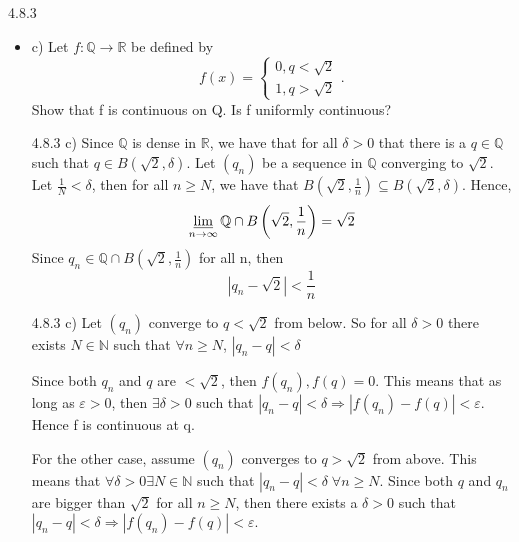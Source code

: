 \documentclass[a4paper,norsk]{article}
\renewcommand{\geq}{\geqslant}
\renewcommand{\epsilon}{\varepsilon}
\begin{document}
\begin{oppgavebox}{4.8.3}{}
\begin{itemize}
\begin{proofbox}{4.8.3 b)}{}
    Hence, $ \overline{f} $ is uniformly continuous.
    
    
    

    
  \end{proofbox}
  \item c) Let $ f : \mathbb{Q} \to \mathbb{R} $ be defined by 
  \[
      f(x) = \begin{cases}
      0, q < \sqrt{ 2 }\\
      1, q > \sqrt{ 2 }
      \end{cases}.
  \]
  Show that f is continuous on Q. Is f uniformly continuous?
  \begin{proofbox}{4.8.3 c)}{}
    Since $ \mathbb{Q} $ is dense in $ \mathbb{R} $, we have that for all $ \delta > 0 $ that there is a $ q \in \mathbb{Q} $ such that $ q \in B \left( \sqrt{ 2 }, \delta  \right)  $. Let $ \left( q_n \right)  $ be a sequence in $ \mathbb{Q} $ converging to $ \sqrt{ 2 } $. Let $ \frac{ 1 }{ N } < \delta  $, then for all $ n \geq N $, we have that $ B \left( \sqrt{ 2 }, \frac{ 1 }{ n } \right) \subseteq B \left( \sqrt{ 2 }, \delta  \right)   $. Hence,
    \[
        \varliminf_{n \to \infty} \mathbb{Q} \cap B \left( \sqrt{ 2 }, \frac{ 1 }{ n } \right) = \sqrt{ 2 }
    \]
    Since $ q_n \in \mathbb{Q} \cap B \left( \sqrt{ 2 }, \frac{ 1 }{ n } \right)  $ for all n, then 
    \[
        \left| q_n - \sqrt{ 2 } \right| < \frac{ 1 }{ n }
    \]
    
    
  \end{proofbox}


  \begin{proofbox}{4.8.3 c)}{}
    Let $ \left( q_n \right)  $ converge to $ q < \sqrt{ 2 } $ from below. So for all $ \delta > 0 $ there exists $ N \in \mathbb{N} $ such that $ \forall n \geq N $, $ \left| q_n - q \right| < \delta   $

    Since both $ q_n  $ and $ q $ are $ < \sqrt{ 2 } $, then $ f(q_n), f(q) = 0 $. This means that as long as $ \epsilon > 0 $, then $ \exists \delta > 0 $ such that $ \left| q_n - q \right| < \delta  \Rightarrow \left| f(q_n) - f(q) \right| < \epsilon  $. Hence f is continuous at q.



    For the other case, assume $ \left( q_n \right)  $ converges to $ q > \sqrt{ 2 } $ from above. This means that $ \forall \delta  > 0 \exists N \in \mathbb{N} $ such that $ \left| q_n - q \right| < \delta \; \forall n \geq N $. Since both $ q $ and $ q_n $ are bigger than $ \sqrt{ 2 } $ for all $ n \geq N $, then there exists a $ \delta > 0 $ such that  $ \left| q_n - q  \right| < \delta  \Rightarrow \left| f(q_n) - f(q) \right| < \epsilon    $.



\end{proofbox}
\end{itemize}
\end{oppgavebox}
\end{document}
